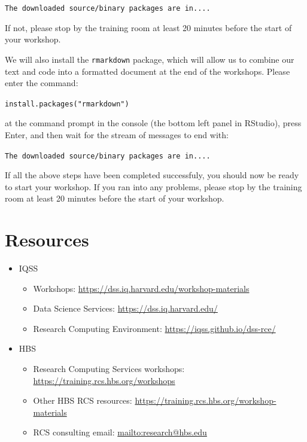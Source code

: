 \documentclass[]{book}
\providecommand{\tightlist}{%
  \setlength{\itemsep}{0pt}\setlength{\parskip}{0pt}}
\begin{document}
\texttt{The\ downloaded\ source/binary\ packages\ are\ in....}

If not, please stop by the training room at least 20 minutes before the start of your workshop.

We will also install the \texttt{rmarkdown} package, which will allow us to
combine our text and code into a formatted document at the end of
the workshops. Please enter the command:

\texttt{install.packages("rmarkdown")}

at the command prompt in the console (the bottom left panel in RStudio),
press Enter, and then wait for the stream of messages to end with:

\texttt{The\ downloaded\ source/binary\ packages\ are\ in....}

If all the above steps have been completed successfuly, you should now
be ready to start your workshop. If you ran into any problems, please
stop by the training room at least 20 minutes before the start of your workshop.

\hypertarget{resources-1}{%
\section{Resources}\label{resources-1}}

\begin{itemize}
\tightlist
\item
  IQSS

  \begin{itemize}
  \tightlist
  \item
    Workshops: \url{https://dss.iq.harvard.edu/workshop-materials}
  \item
    Data Science Services: \url{https://dss.iq.harvard.edu/}
  \item
    Research Computing Environment: \url{https://iqss.github.io/dss-rce/}
  \end{itemize}
\item
  HBS

  \begin{itemize}
  \tightlist
  \item
    Research Computing Services workshops: \url{https://training.rcs.hbs.org/workshops}
  \item
    Other HBS RCS resources: \url{https://training.rcs.hbs.org/workshop-materials}
  \item
    RCS consulting email: \url{mailto:research@hbs.edu}
  \end{itemize}
\end{itemize}
\end{document}
